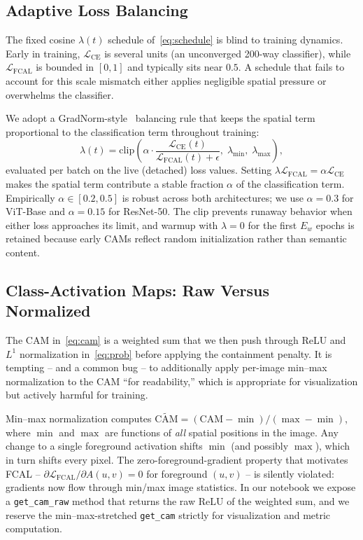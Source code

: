 \documentclass[journal]{IEEEtran}
\begin{document}
\subsection{Adaptive Loss Balancing}
\label{subsec:adaptive}

The fixed cosine $\lambda(t)$ schedule of~\eqref{eq:schedule} is blind to
training dynamics. Early in training, $\mathcal{L}_{\mathrm{CE}}$ is
several units (an unconverged 200-way classifier), while
$\mathcal{L}_{\mathrm{FCAL}}$ is bounded in $[0,1]$ and typically sits
near $0.5$. A schedule that fails to account for this scale mismatch
either applies negligible spatial pressure or overwhelms the classifier.

We adopt a GradNorm-style~\cite{chen2018gradnorm} balancing rule that
keeps the spatial term proportional to the classification term throughout
training:
\begin{equation}
  \lambda(t)
  = \mathrm{clip}\!\left(
    \alpha \cdot
    \frac{\mathcal{L}_{\mathrm{CE}}(t)}{\mathcal{L}_{\mathrm{FCAL}}(t) + \epsilon},\;
    \lambda_{\min},\; \lambda_{\max}\right),
  \label{eq:adaptive}
\end{equation}
evaluated per batch on the live (detached) loss values. Setting
$\lambda \mathcal{L}_{\mathrm{FCAL}} = \alpha \mathcal{L}_{\mathrm{CE}}$
makes the spatial term contribute a stable fraction $\alpha$ of the
classification term. Empirically $\alpha \in [0.2, 0.5]$ is robust across
both architectures; we use $\alpha = 0.3$ for ViT-Base and $\alpha = 0.15$
for ResNet-50. The clip prevents runaway behavior when either loss
approaches its limit, and warmup with $\lambda = 0$ for the first $E_w$
epochs is retained because early CAMs reflect random initialization
rather than semantic content.

\subsection{Class-Activation Maps: Raw Versus Normalized}
\label{subsec:rawcam}

The CAM in~\eqref{eq:cam} is a weighted sum that we then push through
ReLU and $L^1$ normalization in~\eqref{eq:prob} before applying the
containment penalty. It is tempting -- and a common bug -- to additionally
apply per-image min--max normalization to the CAM ``for readability,''
which is appropriate for visualization but actively harmful for training.

Min--max normalization computes
$\widetilde{\mathrm{CAM}} = (\mathrm{CAM} - \min)/(\max - \min)$, where
$\min$ and $\max$ are functions of \emph{all} spatial positions in the
image. Any change to a single foreground activation shifts $\min$ (and
possibly $\max$), which in turn shifts every pixel. The zero-foreground-gradient
property that motivates FCAL -- $\partial \mathcal{L}_{\mathrm{FCAL}} /
\partial A(u,v) = 0$ for foreground $(u,v)$ -- is silently violated:
gradients now flow through min/max image statistics. In our notebook we
expose a \texttt{get\_cam\_raw} method that returns the raw $\mathrm{ReLU}$
of the weighted sum, and we reserve the min--max-stretched
\texttt{get\_cam} strictly for visualization and metric computation.
\end{document}
